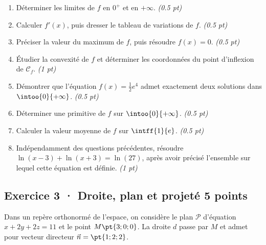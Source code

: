 \begin{enumerate}

\item Déterminer les limites de $f$ en $0^+$ et en $+\infty$. \hfill\textit{(\num{0,5} pt)}

\item Calculer $f' (x)$, puis dresser le tableau de variations de $f$. \hfill\textit{(\num{0,5} pt)}

\item Préciser la valeur du maximum de $f$, puis résoudre $f(x)=0$. \hfill\textit{(\num{0,5} pt)}

\item Étudier la convexité de $f$ et déterminer les coordonnées du point d'inflexion de $\mathcal C_f$. \hfill\textit{(1 pt)}

\item Démontrer que l'équation $f(x)=\frac12 e^{4}$ admet exactement deux solutions dans $\intoo{0}{+\infty}$. \hfill\textit{(\num{0,5} pt)}

\item Déterminer une primitive de $f$ sur $\intoo{0}{+\infty}$. \hfill\textit{(\num{0,5} pt)}

\item Calculer la valeur moyenne de $f$ sur $\intff{1}{e}$. \hfill\textit{(\num{0,5} pt)}

\item Indépendamment des questions précédentes, résoudre $\ln(x-3)+\ln(x+3)=\ln(27)$, après avoir précisé l'ensemble sur lequel cette équation est définie. \hfill\textit{(1 pt)}

\end{enumerate}

\mxnewpage{}

\subsection*{Exercice 3 · Droite, plan et projeté \hfill 5 points}Dans un repère orthonormé de l'espace, on considère le plan $\mathcal P$ d'équation $x+2y+2z=11$ et le point $M\pt{3;0;0}$. La droite $d$ passe par $M$ et admet pour vecteur directeur $\vec n=\pt{1;2;2}$.


